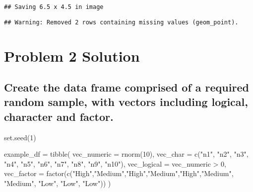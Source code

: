 \documentclass[
]{article}
\newenvironment{Shaded}{\begin{snugshade}}{\end{snugshade}}
\newcommand{\AttributeTok}[1]{\textcolor[rgb]{0.77,0.63,0.00}{#1}}
\newcommand{\DecValTok}[1]{\textcolor[rgb]{0.00,0.00,0.81}{#1}}
\newcommand{\FunctionTok}[1]{\textcolor[rgb]{0.00,0.00,0.00}{#1}}
\newcommand{\NormalTok}[1]{#1}
\newcommand{\OtherTok}[1]{\textcolor[rgb]{0.56,0.35,0.01}{#1}}
\newcommand{\SpecialCharTok}[1]{\textcolor[rgb]{0.00,0.00,0.00}{#1}}
\newcommand{\StringTok}[1]{\textcolor[rgb]{0.31,0.60,0.02}{#1}}
\begin{document}
\begin{verbatim}
## Saving 6.5 x 4.5 in image
\end{verbatim}

\begin{verbatim}
## Warning: Removed 2 rows containing missing values (geom_point).
\end{verbatim}

\hypertarget{problem-2-solution}{%
\section{Problem 2 Solution}\label{problem-2-solution}}

\hypertarget{create-the-data-frame-comprised-of-a-required-random-sample-with-vectors-including-logical-character-and-factor.}{%
\subsection{Create the data frame comprised of a required random sample,
with vectors including logical, character and
factor.}\label{create-the-data-frame-comprised-of-a-required-random-sample-with-vectors-including-logical-character-and-factor.}}

\begin{Shaded}
\begin{Highlighting}[]
\FunctionTok{set.seed}\NormalTok{(}\DecValTok{1}\NormalTok{)}

\NormalTok{example\_df }\OtherTok{=} \FunctionTok{tibble}\NormalTok{(}
  \AttributeTok{vec\_numeric =} \FunctionTok{rnorm}\NormalTok{(}\DecValTok{10}\NormalTok{),}
  \AttributeTok{vec\_char =} \FunctionTok{c}\NormalTok{(}\StringTok{"n1"}\NormalTok{, }\StringTok{"n2"}\NormalTok{, }\StringTok{"n3"}\NormalTok{, }\StringTok{"n4"}\NormalTok{, }\StringTok{"n5"}\NormalTok{, }\StringTok{"n6"}\NormalTok{, }\StringTok{"n7"}\NormalTok{, }\StringTok{"n8"}\NormalTok{, }\StringTok{"n9"}\NormalTok{, }\StringTok{"n10"}\NormalTok{),}
  \AttributeTok{vec\_logical =}\NormalTok{ vec\_numeric }\SpecialCharTok{\textgreater{}} \DecValTok{0}\NormalTok{,}
  \AttributeTok{vec\_factor =} \FunctionTok{factor}\NormalTok{(}\FunctionTok{c}\NormalTok{(}\StringTok{"High"}\NormalTok{,}\StringTok{"Medium"}\NormalTok{,}\StringTok{"High"}\NormalTok{,}\StringTok{"Medium"}\NormalTok{,}\StringTok{"High"}\NormalTok{,}\StringTok{"Medium"}\NormalTok{, }\StringTok{"Medium"}\NormalTok{, }\StringTok{"Low"}\NormalTok{, }\StringTok{"Low"}\NormalTok{, }\StringTok{"Low"}\NormalTok{))}
\NormalTok{)}
\end{Highlighting}
\end{Shaded}
\end{document}
